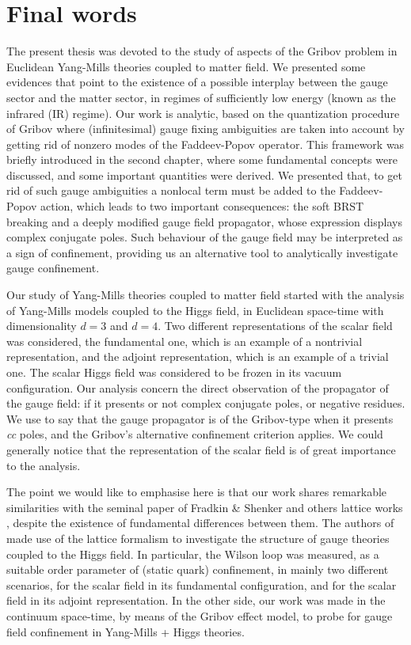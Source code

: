 

\chapter{Final words
\label{finalwords}}


The present thesis was devoted to the study of aspects of the Gribov problem in Euclidean
Yang-Mills theories coupled to matter field.  We presented some evidences that point to the
existence of a possible interplay between the gauge sector and the
matter sector, in regimes of sufficiently low energy (known as the infrared (IR) regime). Our
work is analytic, based on the quantization procedure of Gribov where (infinitesimal) gauge
fixing ambiguities are taken into account by getting rid of nonzero modes of the Faddeev-Popov
operator. This framework was briefly introduced in the second chapter, where some fundamental
concepts were discussed, and some important quantities were derived. We presented that, to get
rid of such gauge ambiguities a nonlocal term must be added to the Faddeev-Popov action, which
leads to two important consequences: the soft BRST breaking and a deeply modified gauge
field propagator, whose expression displays complex conjugate poles. Such behaviour
of the gauge field may be interpreted as a sign of confinement, providing us an alternative
tool to analytically investigate gauge confinement.

Our study of Yang-Mills theories coupled to matter field started with the analysis of
Yang-Mills models coupled to the Higgs field, in Euclidean space-time with dimensionality $d=3$
and $d=4$. Two different representations of the scalar field was considered, the fundamental
one, which is an example of a nontrivial representation, and the adjoint representation, which
is an example of a trivial one. The scalar Higgs field was considered to be frozen in its
vacuum configuration. Our analysis concern the direct observation of the
propagator of the gauge field: if it presents or not complex conjugate poles, or negative
residues. We use to say that the gauge propagator is of the Gribov-type when it presents
\emph{cc} poles, and the Gribov's alternative confinement criterion applies. We could generally
notice that the representation of the scalar field is of great importance to the analysis.

The point we would like to emphasise here is that our work shares remarkable similarities with
the seminal paper of Fradkin \& Shenker \cite{Fradkin:1978dv} and others lattice works
\cite{Nadkarni:1989na,Hart:1996ac}, despite the existence of fundamental differences between
them. The authors of \cite{Fradkin:1978dv} made use of the lattice formalism to investigate the
structure of gauge theories coupled to the Higgs field. In particular, the Wilson loop was
measured, as a suitable order parameter of (static quark) confinement, in mainly two different
scenarios, for the scalar field in its fundamental configuration, and for the scalar field in
its adjoint representation. In the other side, our work was made in the continuum space-time,
by means of the Gribov effect model, to probe for gauge field confinement in Yang-Mills + Higgs
theories.

